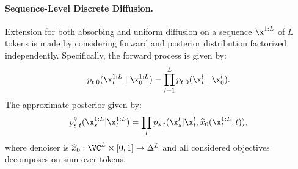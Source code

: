 \paragraph{Sequence-Level Discrete Diffusion.} Extension for both absorbing and uniform diffusion on a sequence $\x^{1:L}$ of $L$ tokens is made by considering forward and posterior distribution factorized independently. Specifically, the forward process is given by:
\begin{gather}
    p_{t|0}(\x_t^{1:L} \mid \x_0^{1:L})
    = \prod_{l=1}^L p_{t|0}(\x_t^l \mid \x_0^l).
    \nonumber
\end{gather}
The approximate posterior given by:
\begin{gather}
    p^{\theta}_{s|t}(\x_s^{1:L}|\x_t^{1:L}) = \prod_{l}p_{s|t}(\x_s^l|\x_t^l,\widehat{x}_0(\x_t^{1:L}, t)),
    \nonumber
\end{gather}
where denoiser is $\widehat{x}_0: \VC^{L} \times [0, 1] \rightarrow \Delta^{L}$ and all considered objectives decomposes on sum over tokens.
